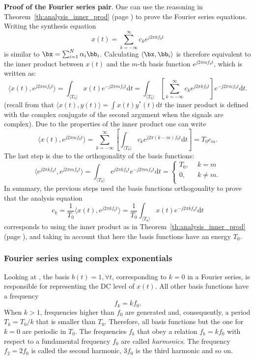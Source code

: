 \bResult \textbf{Proof of the Fourier series pair}.
One can use the reasoning in Theorem~\ref{th:analysis_inner_prod} (page \pageref{th:analysis_inner_prod}) to prove the Fourier series equations. Writing the synthesis equation
\[x(t)  =  \sum_{k=-\infty}^\infty c_k e^{j 2 \pi k f_0 t}\]
is similar to
$\bx=\sum_{i=1}^N \alpha_i \bb_i$. Calculating $\langle\bx,\bb_i\rangle$ is therefore equivalent to the inner product
between $x(t)$ and the $m$-th basis function $e^{j 2 \pi m f_0 t}$, which is written as:
\[
\langle x(t),e^{j 2 \pi m f_0 t}\rangle = \int_{\langle T_0\rangle} x(t) e^{- j 2 \pi m f_0 t} \textrm{d}t = \int_{\langle T_0\rangle} \left[\sum_{k=-\infty}^\infty c_k e^{j 2 \pi k f_0 t} \right] e^{- j 2 \pi m f_0 t} \textrm{d}t.
\]
(recall from  that $\langle x(t),y(t)\rangle=\int x(t)y^*(t)\textrm{d}t$ the inner product is defined with
the complex conjugate of the second argument when the signals are complex). Due to the properties of the inner product one can write
\begin{equation}
\langle x(t),e^{j 2 \pi m f_0 t}\rangle = \sum_{k=-\infty}^\infty \left[\int_{\langle T_0\rangle} c_k e^{j 2 \pi (k-m) f_0 t} \textrm{d}t\right] = T_0 c_m.
\label{eq:fourier_series_proof}
\end{equation}
The last step is due to the orthogonality of the basis functions:
\[\langle e^{j 2 \pi k f_0 t}, e^{j 2 \pi m f_0 t}\rangle = \int_{\langle T_0\rangle} e^{j 2 \pi k f_0 t} e^{- j 2 \pi m f_0 t} \textrm{d}t = \left\{
\begin{array}{ccc}
T_0, & ~~k=m \\
0, & ~~k \ne m.\\
\end{array}
\right.\]
In summary, the previous steps used the basis functions orthogonality to prove that the analysis equation
\[
c_k = \frac{1}{T_0} \langle x(t),e^{j 2 \pi k f_0 t}\rangle = \frac{1}{T_0} \int_{\langle T_0\rangle} x(t) e^{- j 2 \pi k f_0 t} \textrm{d}t
\]
corresponds to using the inner product as in Theorem~\ref{th:analysis_inner_prod} (page \pageref{th:analysis_inner_prod}),
and taking in account that here the basis functions have an energy $T_0$.
\eResult

\subsubsection{Fourier series using complex exponentials}

Looking at , the basis $b(t)=1, \forall t$, corresponding to $k=0$ in a Fourier series, is responsible for representing the DC level of $x(t)$. All other basis functions have a frequency
\[f_k = k f_0.\]
When $k>1$, frequencies higher than $f_0$ are generated and, consequently, a period $T_k = T_0 / k$ that is smaller than $T_0$. Therefore, all basis functions but the one for $k=0$ are periodic in $T_0$.
The frequencies $f_k$ that obey a relation $f_k = k f_0$ with respect to a fundamental frequency $f_0$ are called \emph{harmonics}. The frequency $f_2 = 2 f_0$ is called the second harmonic, $3 f_0$ is the third harmonic and so on.

